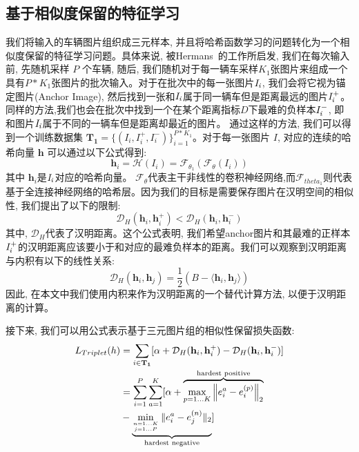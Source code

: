 \subsection{基于相似度保留的特征学习}
我们将输入的车辆图片组织成三元样本, 并且将哈希函数学习的问题转化为一个相似度保留的特征学习问题。具体来说, 被Hermans~\cite{hermans2017defense}的工作所启发, 我们在每次输入前, 先随机采样 $P$ 个车辆, 随后, 我们随机对于每一辆车采样$K_1$张图片来组成一个具有$P*K_1$张图片的批次输入。对于在批次中的每一张图片$\it{I}_i$, 我们会将它视为锚定图片(Anchor Image), 然后找到一张和$\it{I}_i$属于同一辆车但是距离最远的图片$\it{I}_i^+$。同样的方法,我们也会在批次中找到一个在某个距离指标$D$下最难的负样本$\it{I}_i^-$, 即和图片$\it{I}_i$属于不同的一辆车但是距离却最近的图片。 通过这样的方法, 我们可以得到一个训练数据集 $\mathbf{T_{1}} = \{(I_i, I_i^+, I_i^-)\}_{i=1}^{P*K_1}$。对于每一张图片 $I$, 对应的连续的哈希向量 $\mathbf{h}$ 可以通过以下公式得到:
\begin{equation}
    \mathbf{h}_i = \mathcal{H}(I_i) = \mathcal{F}_{\theta_1}(\mathcal{F}_{\theta}(I_i))
\end{equation}
其中 $\mathbf{h}_i$是$\it{I}_i$对应的哈希向量。 $\mathcal{F}_{\theta}$代表主干非线性的卷积神经网络,而$\mathcal{F}_{theta_1}$则代表基于全连接神经网络的哈希层。因为我们的目标是需要保存图片在汉明空间的相似性, 我们提出了以下的限制:
\begin{equation}
    \mathcal{D}_H(\mathbf{h}_i, \mathbf{h}_i^+) < \mathcal{D}_H(\mathbf{h}_i, \mathbf{h}_i^-) 
\end{equation}
其中, $\mathcal{D}_H$代表了汉明距离。这个公式表明, 我们希望anchor图片和其最难的正样本$\it{I}_i^+$的汉明距离应该要小于和对应的最难负样本的距离。我们可以观察到汉明距离与内积有以下的线性关系:
\begin{equation*}
    \mathcal{D}_H(\mathbf{h}_i,\mathbf{h}_j) = \frac{1}{2}(B - \langle \mathbf{h}_i,\mathbf{h}_j \rangle)
\end{equation*}
因此, 在本文中我们使用内积来作为汉明距离的一个替代计算方法, 以便于汉明距离的计算。\par
接下来, 我们可以用公式表示基于三元图片组的相似性保留损失函数:
\begin{equation}
    \begin{array}{l}
    \begin{aligned}
    L_{Triplet} (h)
    &= \sum_{i \in \mathbf{T_{1}}} [\alpha + \mathcal{D}_{H}(\mathbf{h}_i,\mathbf{h}_i^+) - \mathcal{D}_{H}(\mathbf{h}_i, \mathbf{h}_i^-)]  \\
    &=  \sum _{i=1}^{P} \sum _{a=1}^{K}[\alpha+\overbrace{\max _{p=1 \ldots K}\left\|e_{i}^{a}-e_{i}^{(p)}\right\|_{2}}^{\text {hardest positive}}  \\
    &- 
    \underbrace{\min _{n=1 \ldots K \atop j=1 \ldots P} \|e_{i}^{a}-e_{j}^{(n)}\|_{2} }_\textrm{hardest negative}]
    \end{aligned}
    \end{array}
    \label{eq:tripletloss}
    \end{equation}
